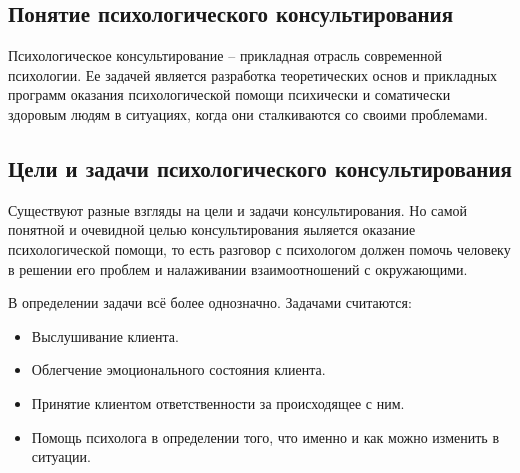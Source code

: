 \documentclass[a4paper, 12pt]{report}
\begin{document}
\renewcommand{\labelenumi}{\textbf{\arabic{enumi}.}}
\renewcommand{\labelenumii}{\textbf{\arabic{enumi}.\arabic{enumii}}}
\renewcommand{\labelenumiii}{\arabic{enumi}.\arabic{enumii}.\arabic{enumiii}}
\renewcommand{\labelenumiv}{\arabic{enumi}.\arabic{enumii}.\arabic{enumiii}.\arabic{enumiv}}
    \subsection*{Понятие психологического консультирования}  
Психологическое консультирование – прикладная отрасль современной
психологии. Ее задачей является разработка теоретических основ и
прикладных программ оказания психологической помощи психически и
соматически здоровым людям в ситуациях, когда они сталкиваются со
своими проблемами. 
    \subsection*{Цели и задачи психологического консультирования}
Существуют разные взгляды на цели и задачи консультирования. 
Но самой понятной и очевидной целью консультирования яыляется 
оказание психологической помощи, то есть разговор с психологом 
должен помочь человеку в решении его
проблем и налаживании взаимоотношений с окружающими.

В определении задачи всё более однозначно. Задачами считаются:

    \begin{itemize}[noitemsep]
        \item Выслушивание клиента.
        \item Облегчение эмоционального состояния клиента.
        \item Принятие клиентом ответственности за происходящее с ним.
        \item Помощь психолога в определении того, что именно и как можно 
        изменить в ситуации.
    \end{itemize}
     
\end{document}
